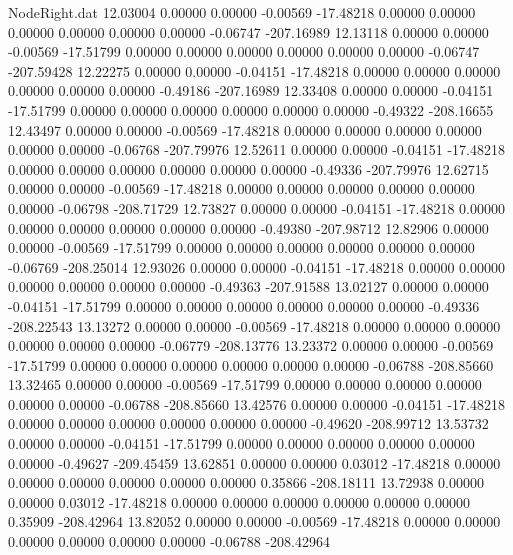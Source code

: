 \begin{filecontents}{NodeRight.dat}
  12.03004    0.00000    0.00000    -0.00569  -17.48218    0.00000    0.00000    0.00000    0.00000    0.00000    0.00000   -0.06747 -207.16989
  12.13118    0.00000    0.00000    -0.00569  -17.51799    0.00000    0.00000    0.00000    0.00000    0.00000    0.00000   -0.06747 -207.59428
  12.22275    0.00000    0.00000    -0.04151  -17.48218    0.00000    0.00000    0.00000    0.00000    0.00000    0.00000   -0.49186 -207.16989
  12.33408    0.00000    0.00000    -0.04151  -17.51799    0.00000    0.00000    0.00000    0.00000    0.00000    0.00000   -0.49322 -208.16655
  12.43497    0.00000    0.00000    -0.00569  -17.48218    0.00000    0.00000    0.00000    0.00000    0.00000    0.00000   -0.06768 -207.79976
  12.52611    0.00000    0.00000    -0.04151  -17.48218    0.00000    0.00000    0.00000    0.00000    0.00000    0.00000   -0.49336 -207.79976
  12.62715    0.00000    0.00000    -0.00569  -17.48218    0.00000    0.00000    0.00000    0.00000    0.00000    0.00000   -0.06798 -208.71729
  12.73827    0.00000    0.00000    -0.04151  -17.48218    0.00000    0.00000    0.00000    0.00000    0.00000    0.00000   -0.49380 -207.98712
  12.82906    0.00000    0.00000    -0.00569  -17.51799    0.00000    0.00000    0.00000    0.00000    0.00000    0.00000   -0.06769 -208.25014
  12.93026    0.00000    0.00000    -0.04151  -17.48218    0.00000    0.00000    0.00000    0.00000    0.00000    0.00000   -0.49363 -207.91588
  13.02127    0.00000    0.00000    -0.04151  -17.51799    0.00000    0.00000    0.00000    0.00000    0.00000    0.00000   -0.49336 -208.22543
  13.13272    0.00000    0.00000    -0.00569  -17.48218    0.00000    0.00000    0.00000    0.00000    0.00000    0.00000   -0.06779 -208.13776
  13.23372    0.00000    0.00000    -0.00569  -17.51799    0.00000    0.00000    0.00000    0.00000    0.00000    0.00000   -0.06788 -208.85660
  13.32465    0.00000    0.00000    -0.00569  -17.51799    0.00000    0.00000    0.00000    0.00000    0.00000    0.00000   -0.06788 -208.85660
  13.42576    0.00000    0.00000    -0.04151  -17.48218    0.00000    0.00000    0.00000    0.00000    0.00000    0.00000   -0.49620 -208.99712
  13.53732    0.00000    0.00000    -0.04151  -17.51799    0.00000    0.00000    0.00000    0.00000    0.00000    0.00000   -0.49627 -209.45459
  13.62851    0.00000    0.00000     0.03012  -17.48218    0.00000    0.00000    0.00000    0.00000    0.00000    0.00000    0.35866 -208.18111
  13.72938    0.00000    0.00000     0.03012  -17.48218    0.00000    0.00000    0.00000    0.00000    0.00000    0.00000    0.35909 -208.42964
  13.82052    0.00000    0.00000    -0.00569  -17.48218    0.00000    0.00000    0.00000    0.00000    0.00000    0.00000   -0.06788 -208.42964

\end{filecontents}
